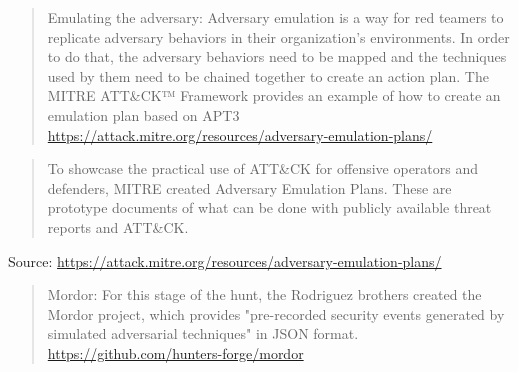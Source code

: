 \documentclass[Screen16to9,17pt]{foils}
\begin{document}

\begin{quote}
Emulating the adversary: Adversary emulation is a way for red teamers to
replicate adversary behaviors in their organization's environments. In order to
do that, the adversary behaviors need to be mapped and the techniques used by
them need to be chained together to create an action plan. The MITRE ATT\&CK™
Framework provides an example of how to create an emulation plan based on APT3\\
\url{https://attack.mitre.org/resources/adversary-emulation-plans/}
\end{quote}



\begin{quote}
To showcase the practical use of ATT\&CK for offensive operators and defenders, MITRE created Adversary Emulation Plans. These are prototype documents of what can be done with publicly available threat reports and ATT\&CK.
\end{quote}
Source: \url{https://attack.mitre.org/resources/adversary-emulation-plans/}





\begin{quote}
Mordor: For this stage of the hunt, the Rodriguez brothers created the Mordor
project, which provides
"pre-recorded security events generated by simulated adversarial techniques" in
JSON format.\\
 \url{https://github.com/hunters-forge/mordor}
\end{quote}







\end{document}
